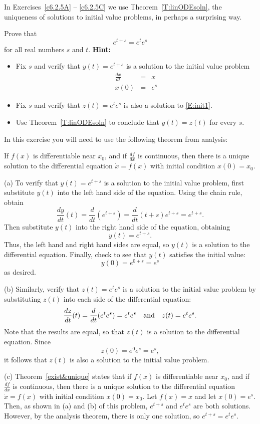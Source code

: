 \documentclass{ximera}
\begin{document}
\noindent In Exercises~\ref{c6.2.5A} -- \ref{c6.2.5C} we use
Theorem~\ref{T:linODEsoln}, the uniqueness of solutions to initial value
problems, in perhaps a surprising way.
\begin{exercise}  \label{c6.2.5A}
Prove that
\[
e^{t+s} = e^te^s
\]
for all real numbers $s$ and $t$.  {\bf Hint:}
\begin{itemize}
\item[(a)]  Fix $s$ and verify that $y(t) = e^{t+s}$ is a solution to the
initial value problem
\begin{equation}  \label{E:init1}
\begin{array}{rcl}
\frac{dx}{dt} & = & x \\
x(0) & = & e^s
\end{array}
\end{equation}
\item[(b)] Fix $s$ and verify that $z(t) = e^te^s$ is also a solution to
\eqref{E:init1}.
\item[(c)]  Use Theorem~\ref{T:linODEsoln} to conclude that $y(t)=z(t)$ for
every $s$.
\end{itemize}
In this exercise you will need to use the following theorem from analysis:
\begin{theorem} \label{exist&unique}
If $f(x)$ is differentiable near $x_0$, and if $\frac{df}{dx}$ is continuous,
then there is a unique solution to the differential equation $\dot{x} = f(x)$
with initial condition $x(0) = x_0$. 
\end{theorem}

\begin{solution}

(a) To verify that $y(t) = e^{t + s}$ is a solution to the initial value
problem, first substitute $y(t)$ into the left hand side of the equation.
Using the chain rule, obtain
\[
\frac{dy}{dt}(t) = \frac{d}{dt}(e^{t + s}) = \frac{d}{dt}(t + s)e^{t + s}
= e^{t + s}.
\]
Then substitute $y(t)$ into the right hand side of the equation, obtaining
\[
y(t) = e^{t + s}.
\]
Thus, the left hand and right hand sides are equal, so $y(t)$ is a
solution to the differential equation.  Finally, check to see that
$y(t)$ satisfies the initial value:
\[
y(0) = e^{0 + s} = e^s
\]
as desired.

(b) Similarly, verify that $z(t) = e^te^s$ is a solution to the initial
value problem by substituting $z(t)$ into each side of the differential
equation:
\[
\frac{dz}{dt}(t) = \frac{d}{dt}(e^te^s) = e^te^s \quad\mbox{and}\quad
z(t) = e^te^s.
\]
Note that the results are equal, so that $z(t)$ is a solution to the
differential equation.  Since
\[
z(0) = e^0e^s = e^s,
\]
it follows that $z(t)$ is also a solution to the initial value problem.

(c) Theorem~\ref{exist&unique} states that if
$f(x)$ is differentiable near $x_0$, and if $\frac{df}{dx}$ is continuous,
then there is a unique solution to the differential equation $\dot{x} = f(x)$
with initial condition $x(0) = x_0$.  Let $f(x) = x$ and let $x(0) = e^s$.
Then, as shown in (a) and (b) of this problem, $e^{t + s}$ and $e^te^s$ are
both solutions.  However, by the analysis theorem, there is only one
solution, so $e^{t + s} = e^te^s$.

\end{solution}
\end{exercise}
\end{document}

